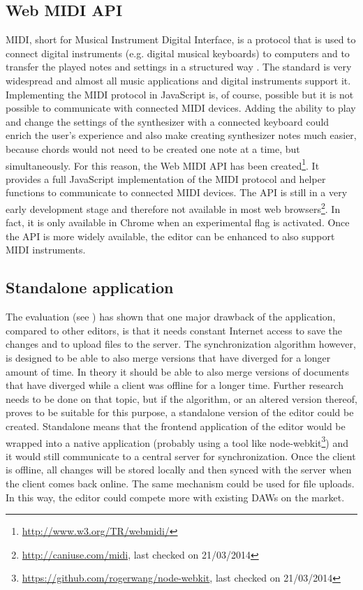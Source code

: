 \subsection{Web MIDI API}

MIDI, short for Musical Instrument Digital Interface, is a protocol that is used to connect digital instruments (e.g. digital musical keyboards) to computers and to transfer the played notes and settings in a structured way \cite[p. 972ff]{curtis1996computer}. The standard is very widespread and almost all music applications and digital instruments support it. Implementing the MIDI protocol in JavaScript is, of course, possible but it is not possible to communicate with connected MIDI devices. Adding the ability to play and change the settings of the synthesizer with a connected keyboard could enrich the user's experience and also make creating synthesizer notes much easier, because chords would not need to be created one note at a time, but simultaneously. For this reason, the Web MIDI API has been created\footnote{\url{http://www.w3.org/TR/webmidi/}}. It provides a full JavaScript implementation of the MIDI protocol and helper functions to communicate to connected MIDI devices. The API is still in a very early development stage and therefore not available in most web browsers\footnote{\url{http://caniuse.com/midi}, last checked on 21/03/2014}. In fact, it is only available in Chrome when an experimental flag is activated. Once the API is more widely available, the editor can be enhanced to also support MIDI instruments.

\subsection{Standalone application}

The evaluation (see ) has shown that one major drawback of the application, compared to other editors, is that it needs constant Internet access to save the changes and to upload files to the server. The synchronization algorithm however, is designed to be able to also merge versions that have diverged for a longer amount of time. In theory it should be able to also merge versions of documents that have diverged while a client was offline for a longer time. Further research needs to be done on that topic, but if the algorithm, or an altered version thereof, proves to be suitable for this purpose, a standalone version of the editor could be created. Standalone means that the frontend application of the editor would be wrapped into a native application (probably using a tool like node-webkit\footnote{\url{https://github.com/rogerwang/node-webkit}, last checked on 21/03/2014}) and it would still communicate to a central server for synchronization. Once the client is offline, all changes will be stored locally and then synced with the server when the client comes back online. The same mechanism could be used for file uploads. In this way, the editor could compete more with existing DAWs on the market.

